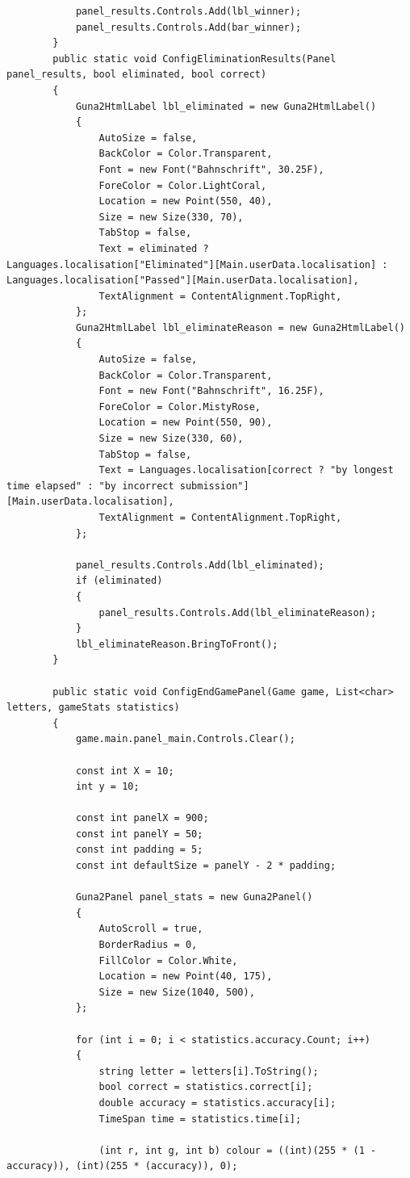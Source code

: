 \documentclass{article}
\begin{document}
\begin{verbatim}
			panel_results.Controls.Add(lbl_winner);
			panel_results.Controls.Add(bar_winner);
		}
		public static void ConfigEliminationResults(Panel panel_results, bool eliminated, bool correct)
		{
			Guna2HtmlLabel lbl_eliminated = new Guna2HtmlLabel()
			{
				AutoSize = false,
				BackColor = Color.Transparent,
				Font = new Font("Bahnschrift", 30.25F),
				ForeColor = Color.LightCoral,
				Location = new Point(550, 40),
				Size = new Size(330, 70),
				TabStop = false,
				Text = eliminated ? Languages.localisation["Eliminated"][Main.userData.localisation] : Languages.localisation["Passed"][Main.userData.localisation],
				TextAlignment = ContentAlignment.TopRight,
			};
			Guna2HtmlLabel lbl_eliminateReason = new Guna2HtmlLabel()
			{
				AutoSize = false,
				BackColor = Color.Transparent,
				Font = new Font("Bahnschrift", 16.25F),
				ForeColor = Color.MistyRose,
				Location = new Point(550, 90),
				Size = new Size(330, 60),
				TabStop = false,
				Text = Languages.localisation[correct ? "by longest time elapsed" : "by incorrect submission"][Main.userData.localisation],
				TextAlignment = ContentAlignment.TopRight,
			};

			panel_results.Controls.Add(lbl_eliminated);
			if (eliminated)
			{
				panel_results.Controls.Add(lbl_eliminateReason);
			}
			lbl_eliminateReason.BringToFront();
		}

		public static void ConfigEndGamePanel(Game game, List<char> letters, gameStats statistics)
		{
			game.main.panel_main.Controls.Clear();

			const int X = 10;
			int y = 10;

			const int panelX = 900;
			const int panelY = 50;
			const int padding = 5;
			const int defaultSize = panelY - 2 * padding;

			Guna2Panel panel_stats = new Guna2Panel()
			{
				AutoScroll = true,
				BorderRadius = 0,
				FillColor = Color.White,
				Location = new Point(40, 175),
				Size = new Size(1040, 500),
			};

			for (int i = 0; i < statistics.accuracy.Count; i++)
			{
				string letter = letters[i].ToString();
				bool correct = statistics.correct[i];
				double accuracy = statistics.accuracy[i];
				TimeSpan time = statistics.time[i];

				(int r, int g, int b) colour = ((int)(255 * (1 - accuracy)), (int)(255 * (accuracy)), 0);


\end{verbatim}
\end{document}
